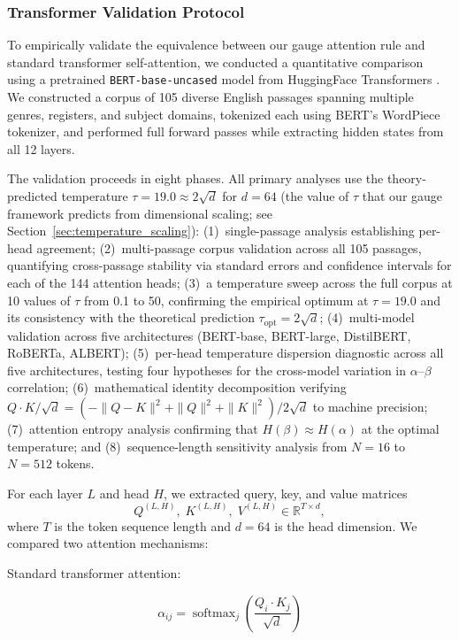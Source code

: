 \documentclass[twoside,11pt]{article}
\begin{document}
\subsubsection{Transformer Validation Protocol}
To empirically validate the equivalence between our gauge attention rule and standard transformer self-attention, we conducted a quantitative comparison using a pretrained \texttt{BERT-base-uncased} model from HuggingFace Transformers \citep{devlin2018bert}. We constructed a corpus of 105 diverse English passages spanning multiple genres, registers, and subject domains, tokenized each using BERT's WordPiece tokenizer, and performed full forward passes while extracting hidden states from all 12 layers.

The validation proceeds in eight phases. All primary analyses use the theory-predicted temperature $\tau = 19.0 \approx 2\sqrt{d}$ for $d = 64$ (the value of $\tau$ that our gauge framework predicts from dimensional scaling; see Section~\ref{sec:temperature_scaling}): (1)~single-passage analysis establishing per-head agreement; (2)~multi-passage corpus validation across all 105 passages, quantifying cross-passage stability via standard errors and confidence intervals for each of the 144 attention heads; (3)~a temperature sweep across the full corpus at 10 values of $\tau$ from 0.1 to 50, confirming the empirical optimum at $\tau = 19.0$ and its consistency with the theoretical prediction $\tau_{\text{opt}} = 2\sqrt{d}$; (4)~multi-model validation across five architectures (BERT-base, BERT-large, DistilBERT, RoBERTa, ALBERT); (5)~per-head temperature dispersion diagnostic across all five architectures, testing four hypotheses for the cross-model variation in $\alpha$--$\beta$ correlation; (6)~mathematical identity decomposition verifying $Q \cdot K / \sqrt{d} = (-\|Q-K\|^2 + \|Q\|^2 + \|K\|^2)/2\sqrt{d}$ to machine precision; (7)~attention entropy analysis confirming that $H(\beta) \approx H(\alpha)$ at the optimal temperature; and (8)~sequence-length sensitivity analysis from $N = 16$ to $N = 512$ tokens.

For each layer $L$ and head $H$, we extracted query, key, and value matrices
\[
Q^{(L,H)},\; K^{(L,H)},\; V^{(L,H)} \in \mathbb{R}^{T \times d},
\]
where $T$ is the token sequence length and $d = 64$ is the head dimension. We compared two attention mechanisms:

Standard transformer attention:

\begin{equation}
\alpha_{ij} = \operatorname{softmax}_j\!\left( \frac{Q_i \cdot K_j}{\sqrt{d}} \right)
\end{equation}
\end{document}
